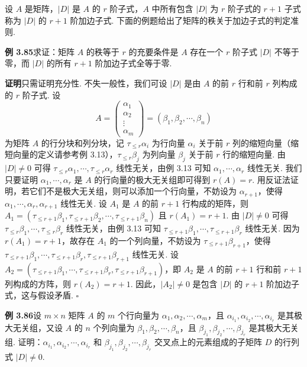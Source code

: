 \documentclass[UTF8,12pt,a4paper,fontset=fandol]{ctexart}
\begin{document}
设 $A$ 是矩阵，$|D|$ 是 $A$ 的 $r$ 阶子式，$A$ 中所有包含 $|D|$ 为 $r$ 阶子式的 $r+1$ 子式称为 $|D|$ 的 $r+1$ 阶加边子式. 下面的例题给出了矩阵的秩关于加边子式的判定准则.

\noindent\textbf{例 3.85}\quad 求证：矩阵 $A$ 的秩等于 $r$ 的充要条件是 $A$ 存在一个 $r$ 阶子式 $|D|$ 不等于零，而 $|D|$ 的所有 $r+1$ 阶加边子式全等于零.

\noindent\textbf{证明}\quad 只需证明充分性. 不失一般性，我们可设 $|D|$ 是由 $A$ 的前 $r$ 行和前 $r$ 列构成的 $r$ 阶子式. 设
\[
A=\begin{pmatrix}\alpha_1\\\alpha_2\\\vdots\\\alpha_m\end{pmatrix}
=(\beta_1,\beta_2,\cdots,\beta_n)
\]
为矩阵 $A$ 的行分块和列分块，记 $\tau_{\le r}\alpha_i$ 为行向量 $\alpha_i$ 关于前 $r$ 列的缩短向量（缩短向量的定义请参考例 3.13），$\tau_{\le r}\beta_j$ 为列向量 $\beta_j$ 关于前 $r$ 行的缩短向量. 由 $|D|\ne 0$ 可得 $\tau_{\le r}\alpha_1,\cdots,\tau_{\le r}\alpha_r$ 线性无关，由例 3.13 可知 $\alpha_1,\cdots,\alpha_r$ 线性无关. 我们只要证明 $\alpha_1,\cdots,\alpha_r$ 是 $A$ 的行向量的极大无关组即可得到 $r(A)=r$. 用反证法证明，若它们不是极大无关组，则可以添加一个行向量，不妨设为 $\alpha_{r+1}$，使得 $\alpha_1,\cdots,\alpha_r,\alpha_{r+1}$ 线性无关. 设 $A_1$ 是 $A$ 的前 $r+1$ 行构成的矩阵，则 $A_1=(\tau_{\le r+1}\beta_1,\tau_{\le r+1}\beta_2,\cdots,\tau_{\le r+1}\beta_n)$ 且 $r(A_1)=r+1$. 由 $|D|\ne 0$ 可得 $\tau_{\le r}\beta_1,\cdots,\tau_{\le r}\beta_r$ 线性无关，由例 3.13 可知 $\tau_{\le r+1}\beta_1,\cdots,\tau_{\le r+1}\beta_r$ 线性无关. 因为 $r(A_1)=r+1$，故存在 $A_1$ 的一个列向量，不妨设为 $\tau_{\le r+1}\beta_{r+1}$，使得 $\tau_{\le r+1}\beta_1,\cdots,\tau_{\le r+1}\beta_r,\tau_{\le r+1}\beta_{r+1}$ 线性无关. 设 $A_2=(\tau_{\le r+1}\beta_1,\cdots,\tau_{\le r+1}\beta_r,\tau_{\le r+1}\beta_{r+1})$，即 $A_2$ 是 $A$ 的前 $r+1$ 行和前 $r+1$ 列构成的方阵，则 $r(A_2)=r+1$. 因此，$|A_2|\ne 0$ 是包含 $|D|$ 的 $r+1$ 阶加边子式，这与假设矛盾. $\square$

\noindent\textbf{例 3.86}\quad 设 $m\times n$ 矩阵 $A$ 的 $m$ 个行向量为 $\alpha_1,\alpha_2,\cdots,\alpha_m$，且 $\alpha_{i_1},\alpha_{i_2},\cdots,\alpha_{i_r}$ 是其极大无关组，又设 $A$ 的 $n$ 个列向量为 $\beta_1,\beta_2,\cdots,\beta_n$，且 $\beta_{j_1},\beta_{j_2},\cdots,\beta_{j_r}$ 是其极大无关组. 证明：$\alpha_{i_1},\alpha_{i_2},\cdots,\alpha_{i_r}$ 和 $\beta_{j_1},\beta_{j_2},\cdots,\beta_{j_r}$ 交叉点上的元素组成的子矩阵 $D$ 的行列式 $|D|\ne 0$.
\end{document}

